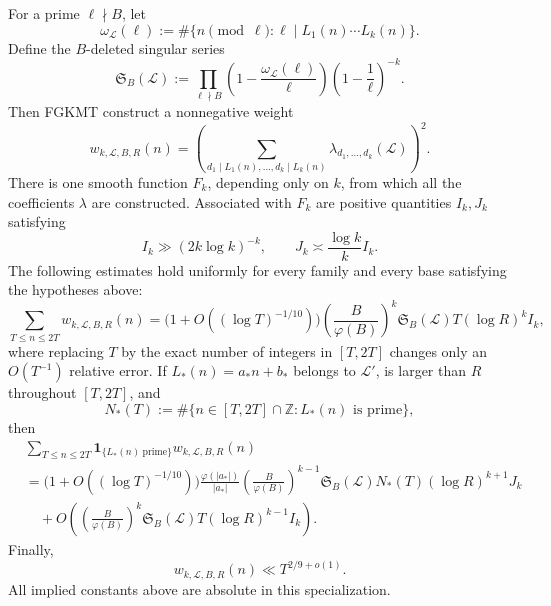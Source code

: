 \documentclass[10pt,letterpaper]{article}
\newcommand{\ZZ}{\mathbb{Z}}
\newcommand{\LL}{\mathcal{L}}
\newcommand{\sing}{\mathfrak{S}}
\newcommand{\ind}{\mathbf{1}}
\begin{document}
For a prime $\ell\nmid B$, let
\begin{equation}
\omega_{\LL}(\ell):=\#\{n\pmod\ell:\ell\mid L_1(n)\cdots L_k(n)\}.
\tag{6.28}
\end{equation}
Define the $B$-deleted singular series
\begin{equation}
\sing_B(\LL):=\prod_{\ell\nmid B}\left(1-\frac{\omega_{\LL}(\ell)}\ell\right)
\left(1-\frac1\ell\right)^{-k}.
\tag{6.29}
\end{equation}
Then FGKMT construct a nonnegative weight
\begin{equation}
w_{k,\LL,B,R}(n)=\left(\sum_{d_1\mid L_1(n),\ldots,d_k\mid L_k(n)}
\lambda_{d_1,\ldots,d_k}(\LL)\right)^2.
\tag{6.30}
\end{equation}
There is one smooth function $F_k$, depending only on $k$, from which all the coefficients $\lambda$ are constructed.
Associated with $F_k$ are positive quantities $I_k,J_k$ satisfying
\begin{equation}
I_k\gg(2k\log k)^{-k},\qquad J_k\asymp\frac{\log k}{k}I_k.
\tag{6.31}
\end{equation}
The following estimates hold uniformly for every family and every base satisfying the hypotheses above:
\begin{equation}
\sum_{T\le n\le2T}w_{k,\LL,B,R}(n)
=\bigl(1+O((\log T)^{-1/10})\bigr)
\left(\frac{B}{\varphi(B)}\right)^k\sing_B(\LL)T(\log R)^kI_k,
\tag{6.32}
\end{equation}
where replacing $T$ by the exact number of integers in $[T,2T]$ changes only an $O(T^{-1})$ relative error. If
$L_*(n)=a_*n+b_*$ belongs to $\LL'$, is larger than $R$ throughout $[T,2T]$, and
\[
N_*(T):=\#\{n\in[T,2T]\cap\ZZ:L_*(n)\text{ is prime}\},
\]
then
\begin{equation}
\begin{aligned}
&\sum_{T\le n\le2T}\ind_{\{L_*(n)\ \mathrm{prime}\}}w_{k,\LL,B,R}(n)\\
&=\bigl(1+O((\log T)^{-1/10})\bigr)
\frac{\varphi(|a_*|)}{|a_*|}\left(\frac{B}{\varphi(B)}\right)^{k-1}
\sing_B(\LL)N_*(T)(\log R)^{k+1}J_k\\
&\quad+O\left(\left(\frac{B}{\varphi(B)}\right)^k\sing_B(\LL)T(\log R)^{k-1}I_k\right).
\end{aligned}
\tag{6.33}
\end{equation}
Finally,
\begin{equation}
w_{k,\LL,B,R}(n)\ll T^{2/9+o(1)}.
\tag{6.34}
\end{equation}
All implied constants above are absolute in this specialization.
\end{document}
